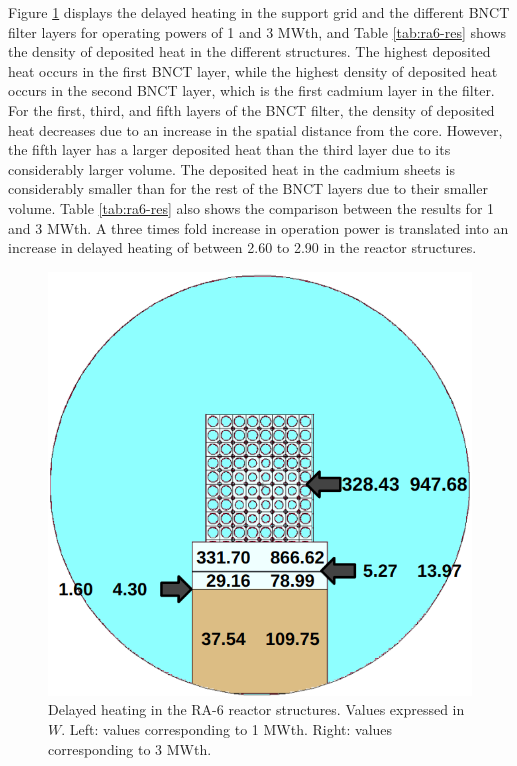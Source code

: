 \documentclass{style/nseJournal}
\providecommand{\DIFadd}[1]{{\protect\color{blue}\uwave{#1}}} %
\providecommand{\DIFdel}[1]{{\protect\color{red}\sout{#1}}}                      %
\providecommand{\DIFaddFL}[1]{\DIFadd{#1}} %
\providecommand{\DIFdelFL}[1]{\DIFdel{#1}} %
\providecommand{\DIFaddbeginFL}{} %
\providecommand{\DIFaddendFL}{} %
\providecommand{\DIFdelbeginFL}{} %
\providecommand{\DIFdelendFL}{} %
\begin{document}
Figure \ref{fig:ra6-3} displays the delayed heating in the support grid and the different BNCT filter layers for operating powers of 1 and 3 MWth, and Table \ref{tab:ra6-res} shows the density of deposited heat in the different structures.
The highest deposited heat occurs in the first BNCT layer, while the highest density of deposited heat occurs in the second BNCT layer, which is the first cadmium layer in the filter.
For the first, third, and fifth layers of the BNCT filter, the density of deposited heat decreases due to an increase in the spatial distance from the core.
However, the fifth layer has a larger deposited heat than the third layer due to its considerably larger volume.
The deposited heat in the cadmium sheets is considerably smaller than for the rest of the BNCT layers due to their smaller volume.
Table \ref{tab:ra6-res} also shows the comparison between the results for 1 and 3 MWth.
A three times fold increase in operation power is translated into an increase in delayed heating of between 2.60 to 2.90 in the reactor structures.

\begin{figure}[htbp!] %
    \centering
    \includegraphics[width=0.80\linewidth]{figures/results_b}
    \hfill
    \caption{Delayed heating in the RA-6 reactor structures. Values expressed in \DIFdelbeginFL \DIFdelFL{$W$}\DIFdelendFL \DIFaddbeginFL \DIFaddFL{W}\DIFaddendFL . Left: values corresponding to 1 MWth. Right: values corresponding to 3 MWth.}
    \label{fig:ra6-3}
\end{figure}
\end{document}
